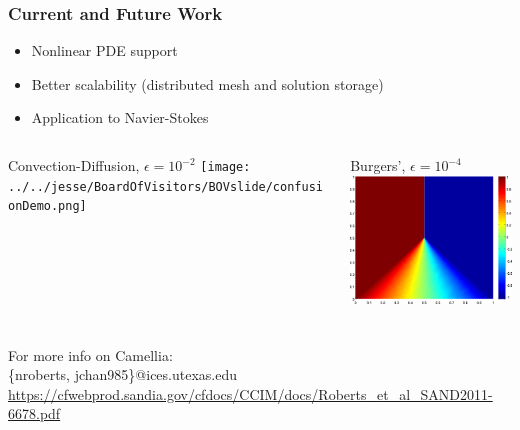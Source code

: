 \documentclass[mathserif]{beamer}
\begin{document}
\begin{frame}
\frametitle{Current and Future Work}
\begin{block}{}
\begin{itemize}
\item Nonlinear PDE support
\item Better scalability (distributed mesh and solution storage)
\item Application to Navier-Stokes
\end{itemize}
\end{block}

\begin{columns}[c]
\begin{column}{5.5cm}
\begin{block}{Convection-Diffusion, $\epsilon=10^{-2}$}
\texttt{[image: ../../jesse/BoardOfVisitors/BOVslide/confusionDemo.png]}
\end{block}
\end{column}
\begin{column}{5.5cm}
\begin{block}{Burgers', $\epsilon=10^{-4}$}
\includegraphics[width=5.5cm]{burgers1e4.png}
\end{block}
\end{column}
\end{columns}
\end{frame}


\begin{frame}
\frametitle{}
\begin{block}{}
For more info on Camellia:\\
\{nroberts, jchan985\}@ices.utexas.edu\\
\url{https://cfwebprod.sandia.gov/cfdocs/CCIM/docs/Roberts_et_al_SAND2011-6678.pdf}
\end{block}

\end{frame}

 
\end{document}
